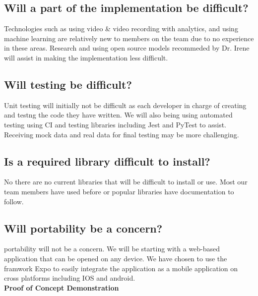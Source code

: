 \documentclass{article}
\begin{document}
\subsection{Will a part of the implementation be difficult?}
Technologies such as using video \& video recording with analytics, and using machine learning are relatively new to members on the team due to no experience in these areas. Research and using open source models recommeded by Dr. Irene will assist in making the implementation less difficult. \\

\subsection{Will testing be difficult?} 
Unit testing will initially not be difficult as each developer in charge of creating and testng the code they have written. We will also being using automated testing using CI and testing libraries including Jest and PyTest to assist. Receiving mock data and real data for final testing may be more challenging. \\

\subsection{Is a required library difficult to install?}
No there are no current libraries that will be difficult to install or use. Most our team members have used before or popular libraries have documentation to follow.\\

\pagebreak

\subsection{Will portability be a concern?}
portability will not be a concern. We will be starting with a web-based application that can be opened on any device. We have chosen to use the framwork Expo to easily integrate the application as a mobile application on cross platforms including IOS and android.\\


\textbf{Proof of Concept Demonstration}
\end{document}
